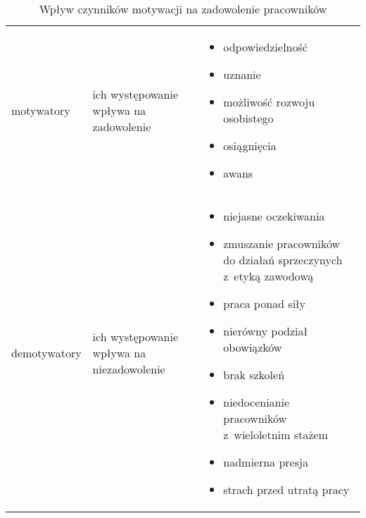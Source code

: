 \noindent\begin{minipage}{\textwidth}
             \begin{table}[H]
                 \raggedright\caption{Wpływ czynników motywacji na zadowolenie pracowników\label{tabela:trychotomia}}
                 \begin{center}
                     \begin{tabular}{|P{.2\textwidth}|P{.2\textwidth}|P{.5\textwidth}|}

                         \hline
                          &
                          &
                          \\
                         \hline

                         motywatory &
                         ich występowanie wpływa na zadowolenie &
                         \begin{itemize}
                             \item odpowiedzielność
                             \item uznanie
                             \item możliwość rozwoju osobistego
                             \item osiągnięcia
                             \item awans
                             \end{itemize}\\
                         \hline

                         demotywatory &
                         ich występowanie wpływa na niezadowolenie &
                         \begin{itemize}
                             \item niejasne oczekiwania
                             \item zmuszanie pracowników do działań sprzeczynych z~etyką zawodową
                             \item praca ponad siły
                             \item nierówny podział obowiązków
                             \item brak szkoleń
                             \item niedocenianie pracowników z~wieloletnim stażem
                             \item nadmierna presja
                             \item strach przed utratą pracy
                             \end{itemize}\\
                         \hline


\end{tabular}
\end{center}
\end{table}
\end{minipage}
